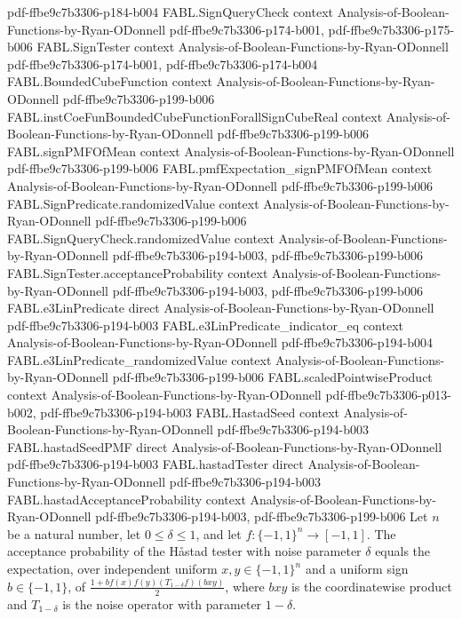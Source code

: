 \begin{theorem}
  {pdf-ffbe9c7b3306-p184-b004}
\proofstep
  {FABL.SignQueryCheck}
  {context}
  {Analysis-of-Boolean-Functions-by-Ryan-ODonnell}
  {pdf-ffbe9c7b3306-p174-b001,
    pdf-ffbe9c7b3306-p175-b006}
\proofstep
  {FABL.SignTester}
  {context}
  {Analysis-of-Boolean-Functions-by-Ryan-ODonnell}
  {pdf-ffbe9c7b3306-p174-b001,
    pdf-ffbe9c7b3306-p174-b004}
\proofstep
  {FABL.BoundedCubeFunction}
  {context}
  {Analysis-of-Boolean-Functions-by-Ryan-ODonnell}
  {pdf-ffbe9c7b3306-p199-b006}
\proofstep
  {FABL.instCoeFunBoundedCubeFunctionForallSignCubeReal}
  {context}
  {Analysis-of-Boolean-Functions-by-Ryan-ODonnell}
  {pdf-ffbe9c7b3306-p199-b006}
\proofstep
  {FABL.signPMFOfMean}
  {context}
  {Analysis-of-Boolean-Functions-by-Ryan-ODonnell}
  {pdf-ffbe9c7b3306-p199-b006}
\proofstep
  {FABL.pmfExpectation_signPMFOfMean}
  {context}
  {Analysis-of-Boolean-Functions-by-Ryan-ODonnell}
  {pdf-ffbe9c7b3306-p199-b006}
\proofstep
  {FABL.SignPredicate.randomizedValue}
  {context}
  {Analysis-of-Boolean-Functions-by-Ryan-ODonnell}
  {pdf-ffbe9c7b3306-p199-b006}
\proofstep
  {FABL.SignQueryCheck.randomizedValue}
  {context}
  {Analysis-of-Boolean-Functions-by-Ryan-ODonnell}
  {pdf-ffbe9c7b3306-p194-b003,
    pdf-ffbe9c7b3306-p199-b006}
\proofstep
  {FABL.SignTester.acceptanceProbability}
  {context}
  {Analysis-of-Boolean-Functions-by-Ryan-ODonnell}
  {pdf-ffbe9c7b3306-p194-b003,
    pdf-ffbe9c7b3306-p199-b006}
\proofstep
  {FABL.e3LinPredicate}
  {direct}
  {Analysis-of-Boolean-Functions-by-Ryan-ODonnell}
  {pdf-ffbe9c7b3306-p194-b003}
\proofstep
  {FABL.e3LinPredicate_indicator_eq}
  {context}
  {Analysis-of-Boolean-Functions-by-Ryan-ODonnell}
  {pdf-ffbe9c7b3306-p194-b004}
\proofstep
  {FABL.e3LinPredicate_randomizedValue}
  {context}
  {Analysis-of-Boolean-Functions-by-Ryan-ODonnell}
  {pdf-ffbe9c7b3306-p199-b006}
\proofstep
  {FABL.scaledPointwiseProduct}
  {context}
  {Analysis-of-Boolean-Functions-by-Ryan-ODonnell}
  {pdf-ffbe9c7b3306-p013-b002,
    pdf-ffbe9c7b3306-p194-b003}
\proofstep
  {FABL.HastadSeed}
  {context}
  {Analysis-of-Boolean-Functions-by-Ryan-ODonnell}
  {pdf-ffbe9c7b3306-p194-b003}
\proofstep
  {FABL.hastadSeedPMF}
  {direct}
  {Analysis-of-Boolean-Functions-by-Ryan-ODonnell}
  {pdf-ffbe9c7b3306-p194-b003}
\proofstep
  {FABL.hastadTester}
  {direct}
  {Analysis-of-Boolean-Functions-by-Ryan-ODonnell}
  {pdf-ffbe9c7b3306-p194-b003}
\proofstep
  {FABL.hastadAcceptanceProbability}
  {context}
  {Analysis-of-Boolean-Functions-by-Ryan-ODonnell}
  {pdf-ffbe9c7b3306-p194-b003,
    pdf-ffbe9c7b3306-p199-b006}
Let $n$ be a natural number, let $0\leq\delta\leq1$, and let $f:\{-1,1\}^n\to[-1,1]$.
The acceptance probability of the Håstad tester with noise parameter $\delta$ equals the
expectation, over independent uniform $x,y\in\{-1,1\}^n$ and a uniform sign
$b\in\{-1,1\}$, of $\frac{1+b f(x)f(y)(T_{1-\delta}f)(bxy)}{2}$, where $bxy$ is the
coordinatewise product and $T_{1-\delta}$ is the noise operator with parameter
$1-\delta$.
\end{theorem}

